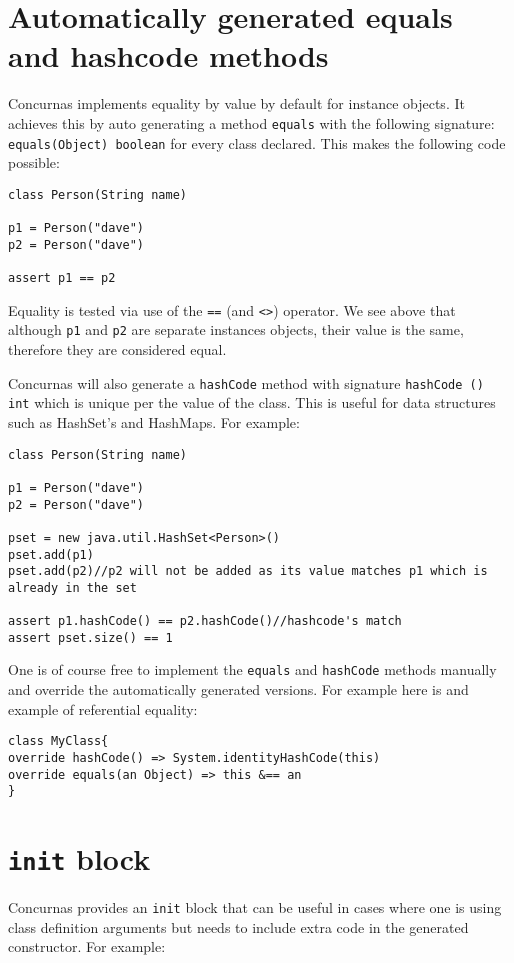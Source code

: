 \documentclass[conc-doc]{subfiles}
\begin{document}
\section{Automatically generated equals and hashcode methods}
\label{autoGeneqAndHash}
Concurnas implements equality by value by default for instance objects. It achieves this by auto generating a method \lstinline{equals} with the following signature: \lstinline{equals(Object) boolean} for every class declared. This makes the following code possible:

\begin{lstlisting}
class Person(String name)

p1 = Person("dave")
p2 = Person("dave")

assert p1 == p2
\end{lstlisting}

Equality is tested via use of the \lstinline{==} (and \lstinline{<>}) operator. We see above that although \lstinline{p1} and \lstinline{p2} are separate instances objects, their value is the same, therefore they are considered equal. 

Concurnas will also generate a \lstinline{hashCode} method with signature \lstinline{hashCode () int} which is unique per the value of the class. This is useful for data structures such as HashSet's and HashMaps. For example:

\begin{lstlisting}
class Person(String name)

p1 = Person("dave")
p2 = Person("dave")

pset = new java.util.HashSet<Person>()
pset.add(p1)
pset.add(p2)//p2 will not be added as its value matches p1 which is already in the set

assert p1.hashCode() == p2.hashCode()//hashcode's match
assert pset.size() == 1
\end{lstlisting}

One is of course free to implement the \lstinline{equals} and \lstinline{hashCode} methods manually and override the automatically generated versions. For example here is and example of referential equality:

\begin{lstlisting}
class MyClass{
override hashCode() => System.identityHashCode(this)
override equals(an Object) => this &== an
}
\end{lstlisting}

\section{\lstinline{init} block}
Concurnas provides an \lstinline{init} block that can be useful in cases where one is using class definition arguments but needs to include extra code in the generated constructor. For example:
\end{document}
